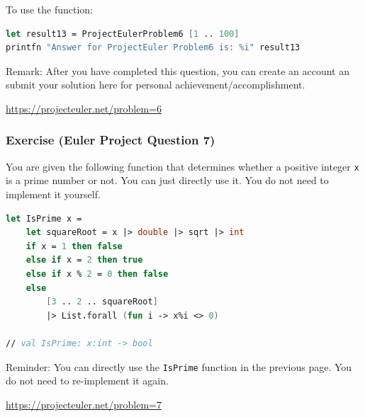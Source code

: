\documentclass[12pt]{article}
\begin{document}
To use the function:
\begin{lstlisting}[language=FSharp]
let result13 = ProjectEulerProblem6 [1 .. 100]
printfn "Answer for ProjectEuler Problem6 is: %i" result13
\end{lstlisting}
Remark: After you have completed this question, you can create an account an submit your solution here for personal achievement/accomplishment.

\url{https://projecteuler.net/problem=6}

\subsubsection*{Exercise (Euler Project Question 7)}
You are given the following function that determines whether a positive integer \texttt{x} is a prime number or not. You can just directly use it. You do not need to implement it yourself.
\begin{lstlisting}[language=FSharp]
let IsPrime x =
    let squareRoot = x |> double |> sqrt |> int 
    if x = 1 then false
    else if x = 2 then true
    else if x % 2 = 0 then false
    else 
        [3 .. 2 .. squareRoot]
        |> List.forall (fun i -> x%i <> 0)

// val IsPrime: x:int -> bool
\end{lstlisting}
Reminder: You can directly use the \texttt{IsPrime} function in the previous page. You do not need to re-implement it again.

\url{https://projecteuler.net/problem=7}
\end{document}
